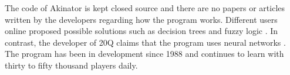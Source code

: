 The code of Akinator is kept closed source and there are no papers or articles written by the developers regarding how the program works.
Different users online proposed possible solutions such as decision trees \cite{allain:2013} and fuzzy logic \cite{chan:2014}.
In contrast, the developer of 20Q claims that the program uses neural networks  \cite{schrock:2006}.
The program has been in development since 1988 and continues to learn with thirty to fifty thousand players daily.
